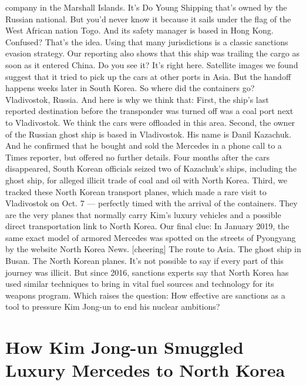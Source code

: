 \begin{itemize}
  company in the Marshall Islands. It's Do Young Shipping that's owned
  by the Russian national. But you'd never know it because it sails
  under the flag of the West African nation Togo. And its safety manager
  is based in Hong Kong. Confused? That's the idea. Using that many
  jurisdictions is a classic sanctions evasion strategy. Our reporting
  also shows that this ship was trailing the cargo as soon as it entered
  China. Do you see it? It's right here. Satellite images we found
  suggest that it tried to pick up the cars at other ports in Asia. But
  the handoff happens weeks later in South Korea. So where did the
  containers go? Vladivostok, Russia. And here is why we think that:
  First, the ship's last reported destination before the transponder was
  turned off was a coal port next to Vladivostok. We think the cars were
  offloaded in this area. Second, the owner of the Russian ghost ship is
  based in Vladivostok. His name is Danil Kazachuk. And he confirmed
  that he bought and sold the Mercedes in a phone call to a Times
  reporter, but offered no further details. Four months after the cars
  disappeared, South Korean officials seized two of Kazachuk's ships,
  including the ghost ship, for alleged illicit trade of coal and oil
  with North Korea. Third, we tracked these North Korean transport
  planes, which made a rare visit to Vladivostok on Oct. 7 --- perfectly
  timed with the arrival of the containers. They are the very planes
  that normally carry Kim's luxury vehicles and a possible direct
  transportation link to North Korea. Our final clue: In January 2019,
  the same exact model of armored Mercedes was spotted on the streets of
  Pyongyang by the website North Korea News. {[}cheering{]} The route to
  Asia. The ghost ship in Busan. The North Korean planes. It's not
  possible to say if every part of this journey was illicit. But since
  2016, sanctions experts say that North Korea has used similar
  techniques to bring in vital fuel sources and technology for its
  weapons program. Which raises the question: How effective are
  sanctions as a tool to pressure Kim Jong-un to end his nuclear
  ambitions?
\end{itemize}

\hypertarget{how-kim-jong-un-smuggled-luxury-mercedes-to-north-korea-1}{%
\section{How Kim Jong-un Smuggled Luxury Mercedes to North
Korea}\label{how-kim-jong-un-smuggled-luxury-mercedes-to-north-korea-1}}

